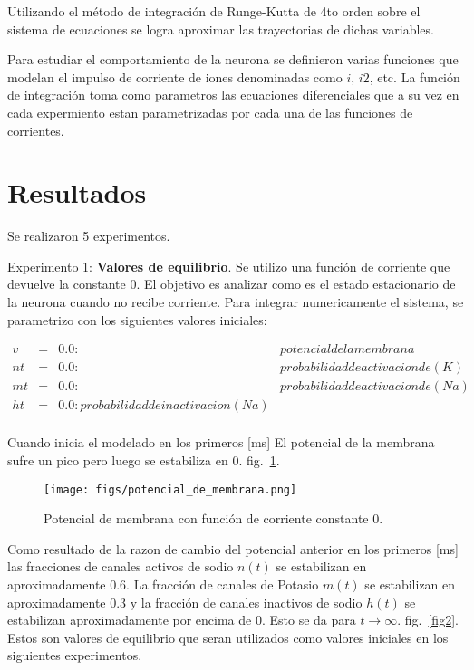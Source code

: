 \documentclass[aps,prl,twocolumn,groupedaddress]{revtex4-2}
\begin{document}
Utilizando el método de integración de Runge-Kutta de 4to orden  sobre el sistema de ecuaciones se logra aproximar las trayectorias de dichas variables.


Para estudiar el comportamiento de la neurona se definieron varias funciones que modelan el impulso de corriente de iones
denominadas como $i$, $i2$, etc.
La función de integración toma como parametros las ecuaciones diferenciales que a su vez en cada expermiento estan parametrizadas por cada una de las funciones de corrientes.


\section{Resultados}
Se realizaron 5 experimentos.

Experimento 1: \textbf{Valores de equilibrio}. Se utilizo una función de corriente que devuelve la constante 0. El objetivo es analizar como es el estado estacionario de la neurona cuando no recibe corriente.
Para integrar numericamente el sistema, se parametrizo con los siguientes valores iniciales:

\begin{eqnarray*}
{v}&=&0.0:&potencial de la membrana\\
{nt}&=&0.0:&probabilidad de activacion de (K)\\
{mt}&=&0.0:&probabilidad de activacion de (Na)\\
{ht}&=&0.0:probabilidad de inactivacion (Na)\\
&
\end{eqnarray*}

Cuando inicia el modelado en los primeros [ms] El potencial de la membrana sufre un pico pero luego se estabiliza en 0. fig.~\ref{fig1}.

\begin{figure}[h!]
\centering
\texttt{[image: figs/potencial\_de\_membrana.png]}
\caption{Potencial de membrana con función de corriente constante 0. \label{fig1}}
\end{figure}


Como resultado de la razon de cambio del potencial anterior en los primeros [ms] las fracciones de canales activos de sodio $n(t)$ se estabilizan en aproximadamente 0.6. La fracción de canales de Potasio $m(t)$ se estabilizan en aproximadamente 0.3 y la fracción de canales inactivos de sodio $h(t)$ se estabilizan aproximadamente por encima de 0. Esto se da para ${t \to \infty}$. fig.~\ref{fig2}. Estos son valores de equilibrio que seran utilizados como valores iniciales en los siguientes experimentos.
\end{document}
